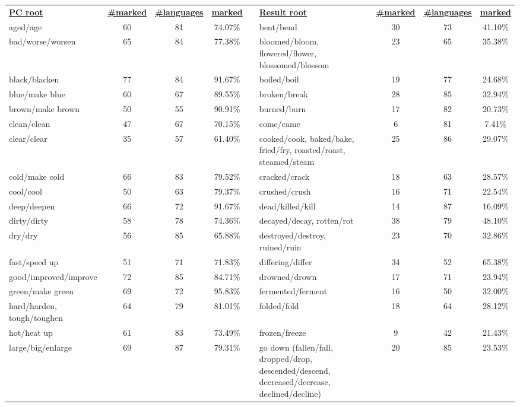 \begin{tabular}{p{3cm}ccccp{3cm}ccc}
\underline{\textbf{PC root}} & \underline{\textbf{\#marked}} & \underline{\textbf{\#languages}} & \underline{\textbf{marked}} & & \underline{\textbf{Result root}} & \underline{\textbf{\#marked}} & \underline{\textbf{\#languages}} & \underline{\textbf{marked}} \\
aged/age & 60 & 81 & 74.07\% & & bent/bend & 30 & 73 & 41.10\% \\
bad/worse/worsen & 65 & 84 & 77.38\% & & bloomed/bloom, flowered/flower, blossomed/blossom & 23 & 65 & 35.38\% \\
black/blacken & 77 & 84 & 91.67\% & & boiled/boil & 19 & 77 & 24.68\% \\
blue/make blue & 60 & 67 & 89.55\% & & broken/break & 28 & 85 & 32.94\% \\
brown/make brown & 50 & 55 & 90.91\% & & burned/burn & 17 & 82 & 20.73\% \\
clean/clean & 47 & 67 & 70.15\% & & come/came & 6 & 81 & 7.41\% \\
clear/clear & 35 & 57 & 61.40\% & & cooked/cook, baked/bake, fried/fry, roasted/roast, steamed/steam & 25 & 86 & 29.07\% \\
cold/make cold & 66 & 83 & 79.52\% & & cracked/crack & 18 & 63 & 28.57\% \\
cool/cool & 50 & 63 & 79.37\% & & crushed/crush & 16 & 71 & 22.54\% \\
deep/deepen & 66 & 72 & 91.67\% & & dead/killed/kill & 14 & 87 & 16.09\% \\
dirty/dirty & 58 & 78 & 74.36\% & & decayed/decay, rotten/rot & 38 & 79 & 48.10\% \\
dry/dry & 56 & 85 & 65.88\% & & destroyed/destroy, ruined/ruin & 23 & 70 & 32.86\% \\
fast/speed up & 51 & 71 & 71.83\% & & differing/differ & 34 & 52 & 65.38\% \\
good/improved/improve & 72 & 85 & 84.71\% & & drowned/drown & 17 & 71 & 23.94\% \\
green/make green & 69 & 72 & 95.83\% & & fermented/ferment & 16 & 50 & 32.00\% \\
hard/harden, tough/toughen & 64 & 79 & 81.01\% & & folded/fold & 18 & 64 & 28.12\% \\
hot/heat up & 61 & 83 & 73.49\% & & frozen/freeze & 9 & 42 & 21.43\% \\
large/big/enlarge & 69 & 87 & 79.31\% & & go down (fallen/fall, dropped/drop, descended/descend, decreased/decrease, declined/decline) & 20 & 85 & 23.53\% \\

\end{tabular}
